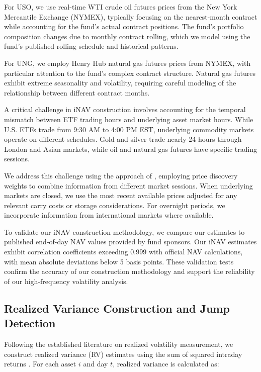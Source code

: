 For USO, we use real-time WTI crude oil futures prices from the New York Mercantile Exchange (NYMEX), typically focusing on the nearest-month contract while accounting for the fund's actual contract positions. The fund's portfolio composition changes due to monthly contract rolling, which we model using the fund's published rolling schedule and historical patterns.

For UNG, we employ Henry Hub natural gas futures prices from NYMEX, with particular attention to the fund's complex contract structure. Natural gas futures exhibit extreme seasonality and volatility, requiring careful modeling of the relationship between different contract months.

A critical challenge in iNAV construction involves accounting for the temporal mismatch between ETF trading hours and underlying asset market hours. While U.S. ETFs trade from 9:30 AM to 4:00 PM EST, underlying commodity markets operate on different schedules. Gold and silver trade nearly 24 hours through London and Asian markets, while oil and natural gas futures have specific trading sessions.

We address this challenge using the approach of \citet{krehbiel2019real}, employing price discovery weights to combine information from different market sessions. When underlying markets are closed, we use the most recent available prices adjusted for any relevant carry costs or storage considerations. For overnight periods, we incorporate information from international markets where available.

To validate our iNAV construction methodology, we compare our estimates to published end-of-day NAV values provided by fund sponsors. Our iNAV estimates exhibit correlation coefficients exceeding 0.999 with official NAV calculations, with mean absolute deviations below 5 basis points. These validation tests confirm the accuracy of our construction methodology and support the reliability of our high-frequency volatility analysis.

\subsection{Realized Variance Construction and Jump Detection}

Following the established literature on realized volatility measurement, we construct realized variance (RV) estimates using the sum of squared intraday returns \citep{andersen2001distribution}. For each asset $i$ and day $t$, realized variance is calculated as:

